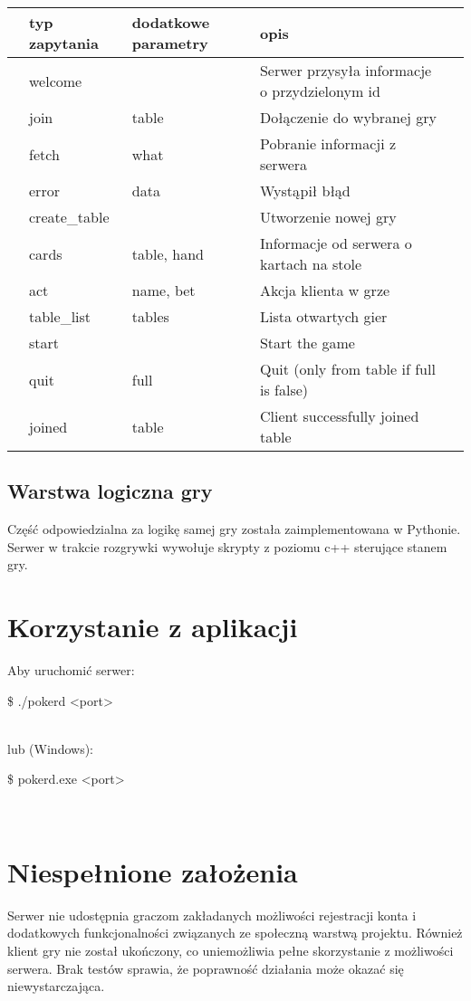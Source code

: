\documentclass[12pt,a4paper]{article}
\begin{document}
\begin{table}[h]
\begin{tabular}{lllll}
\hline
 & typ zapytania & dodatkowe parametry & opis &  \\ \hline
 & welcome &  & Serwer przysyła informacje o przydzielonym id &  \\
 & join & table & Dołączenie do wybranej gry &  \\
 & fetch & what & Pobranie informacji z serwera &  \\
 & error & data & Wystąpił błąd &  \\
 & create\_table &  & Utworzenie nowej gry &  \\ 
 & cards & table, hand & Informacje od serwera o kartach na stole &  \\ 
 & act & name, bet & Akcja klienta w grze &  \\ 
 & table\_list & tables & Lista otwartych gier &  \\ 
 & start &  & Start the game &  \\ 
 & quit & full & Quit (only from table if full is false) &  \\ 
 & joined & table & Client successfully joined table &  \\ 
 \hline
\end{tabular}
\end{table}

\subsection{Warstwa logiczna gry}
Część odpowiedzialna za logikę samej gry została zaimplementowana w Pythonie.
Serwer w trakcie rozgrywki wywołuje skrypty z poziomu c++ sterujące stanem gry.

\section{Korzystanie z aplikacji}
Aby uruchomić serwer:\\
\begin{code}
\$ ./pokerd <port>
\end{code}\\
lub (Windows):\\
\begin{code}
\$ pokerd.exe <port>
\end{code}\\

\section{Niespełnione założenia}
Serwer nie udostępnia graczom zakładanych możliwości rejestracji konta i dodatkowych
funkcjonalności związanych ze społeczną warstwą projektu. Również klient gry nie został ukończony, co uniemożliwia pełne skorzystanie z możliwości serwera.
Brak testów sprawia, że poprawność działania może okazać się niewystarczająca.
\end{document}
